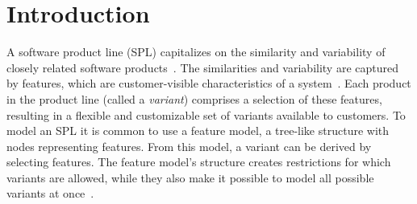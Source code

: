 



\chapter{Introduction}

A software product line (SPL) capitalizes on the similarity and variability of closely related software products~\cite{book:introduction-to-spl}. The similarities and variability are captured by features, which are customer-visible characteristics of a system~\cite{book:introduction-to-spl}. Each product in the product line (called a \textit{variant}) comprises a selection of these features, resulting in a flexible and customizable set of variants available to customers. To model an SPL it is common to use a feature model, a tree-like structure with nodes representing features. From this model, a variant can be derived by selecting features. The feature model's structure creates restrictions for which variants are allowed, while they also make it possible to model all possible variants at once~\cite{art:feature-models-grammars-and-propositional-formulas}.

